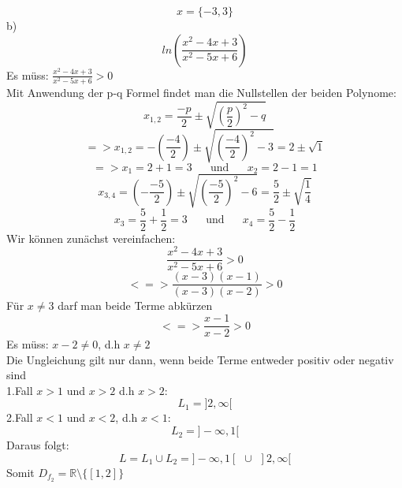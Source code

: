 \documentclass[11pt]{article}
\begin{document}
				$$x=\{-3,3\}$$
			\indent b)
						$$ln\left(\frac{x^2-4x+3}{x^2-5x+6}\right)$$
						Es müss: $\frac{x^2-4x+3}{x^2-5x+6} >0$\\
						Mit Anwendung der p-q Formel findet man die Nullstellen der beiden Polynome:\\
						$$x_{1,2}=\frac{-p}{2}\pm \sqrt{\left(\frac{p}{2}\right)^2-q}$$
						$$=>x_{1,2}=-\left(\frac{-4}{2}\right)\pm \sqrt{\left(\frac{-4}{2}\right)^2-3}=2 \pm \sqrt{1}$$
						$$=>x_1 = 2+1=3 \hspace{20pt}\mbox{und}\hspace{20pt} x_2 = 2-1=1$$
						$$x_{3,4}=\left(-\frac{-5}{2}\right)\pm \sqrt{\left(\frac{-5}{2}\right)^2-6}= \frac{5}{2} \pm \sqrt{\frac{1}{4}}$$
						$$x_3=\frac{5}{2}+\frac{1}{2}=3 \hspace{20pt}\mbox{und}\hspace{20pt} x_4=\frac{5}{2}-\frac{1}{2}$$
						Wir können zunächst vereinfachen:
						$$\frac{x^2-4x+3}{x^2-5x+6}>0$$
						$$<=>\frac{(x-3)(x-1)}{(x-3)(x-2)}>0$$
						Für $x \neq 3$ darf man beide Terme abkürzen
						$$<=>\frac{x-1}{x-2}>0$$
						Es müss: $x-2\neq 0$, d.h $x \neq 2$\\
						Die Ungleichung gilt nur dann, wenn beide Terme entweder positiv oder negativ sind\\
						1.Fall $x>1$ und $x>2$ d.h $x>2$:
							$$L_1=]2,\infty[$$
						2.Fall $x<1$ und $x<2$, d.h $x<1$:
							$$L_2=]-\infty,1[$$
						Daraus folgt:\\
						$$L=L_1\cup L_2 = ]-\infty,1[ \hspace{5pt} \cup \hspace{5pt} ]2,\infty[$$
						Somit $D_{f_2}=\mathbb{R}\setminus\{[1,2]\}$						
\end{document}
